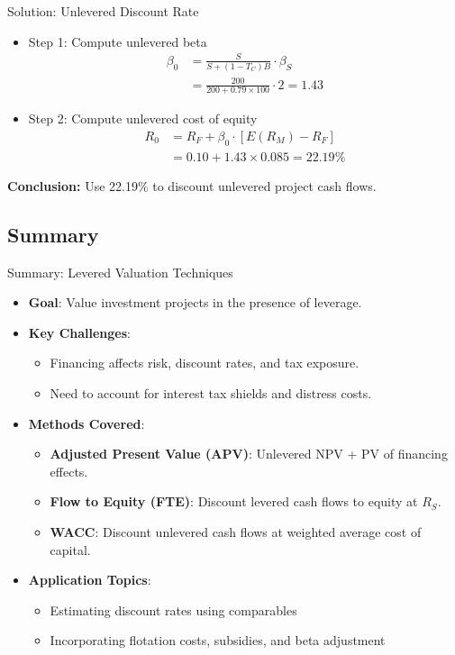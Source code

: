 \begin{frame}{Solution: Unlevered Discount Rate}
	
	\begin{itemize}
		\item Step 1: Compute unlevered beta
		\begin{align*}
			\beta_0 &= \frac{S}{S + (1 - T_C) B} \cdot \beta_S \\
			&= \frac{200}{200 + 0.79 \times 100} \cdot 2 = 1.43
		\end{align*}
		
		\pause
		\item Step 2: Compute unlevered cost of equity
		\begin{align*}
			R_0 &= R_F + \beta_0 \cdot [E(R_M) - R_F] \\
			&= 0.10 + 1.43 \times 0.085 = 22.19\%
		\end{align*}
	\end{itemize}
	\pause
	\textbf{Conclusion:} Use 22.19\% to discount unlevered project cash flows.
	
\end{frame}

\subsection*{Summary}
\begin{frame}{Summary: Levered Valuation Techniques}
	\begin{itemize}
		\item \textbf{Goal}: Value investment projects in the presence of leverage.
		\item \textbf{Key Challenges}:
		\begin{itemize}
			\item Financing affects risk, discount rates, and tax exposure.
			\item Need to account for interest tax shields and distress costs.
		\end{itemize}
		\item \textbf{Methods Covered}:
		\begin{itemize}
			\item \textbf{Adjusted Present Value (APV)}: Unlevered NPV + PV of financing effects.
			\item \textbf{Flow to Equity (FTE)}: Discount levered cash flows to equity at $R_S$.
			\item \textbf{WACC}: Discount unlevered cash flows at weighted average cost of capital.
		\end{itemize}
		\item \textbf{Application Topics}:
		\begin{itemize}
			\item Estimating discount rates using comparables
			\item Incorporating flotation costs, subsidies, and beta adjustment
		\end{itemize}
	\end{itemize}
\end{frame}

